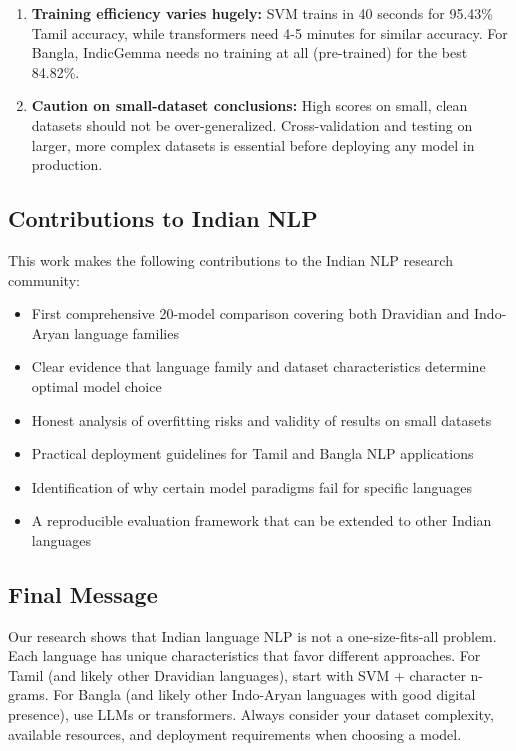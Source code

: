 \documentclass[conference]{IEEEtran}
\begin{document}
\begin{enumerate}
\item \textbf{Training efficiency varies hugely:} SVM trains in 40 seconds for 95.43\% Tamil accuracy, while transformers need 4-5 minutes for similar accuracy. For Bangla, IndicGemma needs no training at all (pre-trained) for the best 84.82\%.

\item \textbf{Caution on small-dataset conclusions:} High scores on small, clean datasets should not be over-generalized. Cross-validation and testing on larger, more complex datasets is essential before deploying any model in production.
\end{enumerate}

\subsection{Contributions to Indian NLP}

This work makes the following contributions to the Indian NLP research community:
\begin{itemize}
\item First comprehensive 20-model comparison covering both Dravidian and Indo-Aryan language families
\item Clear evidence that language family and dataset characteristics determine optimal model choice
\item Honest analysis of overfitting risks and validity of results on small datasets
\item Practical deployment guidelines for Tamil and Bangla NLP applications
\item Identification of why certain model paradigms fail for specific languages
\item A reproducible evaluation framework that can be extended to other Indian languages
\end{itemize}

\subsection{Final Message}

Our research shows that Indian language NLP is not a one-size-fits-all problem. Each language has unique characteristics that favor different approaches. For Tamil (and likely other Dravidian languages), start with SVM + character n-grams. For Bangla (and likely other Indo-Aryan languages with good digital presence), use LLMs or transformers. Always consider your dataset complexity, available resources, and deployment requirements when choosing a model.
\end{document}
